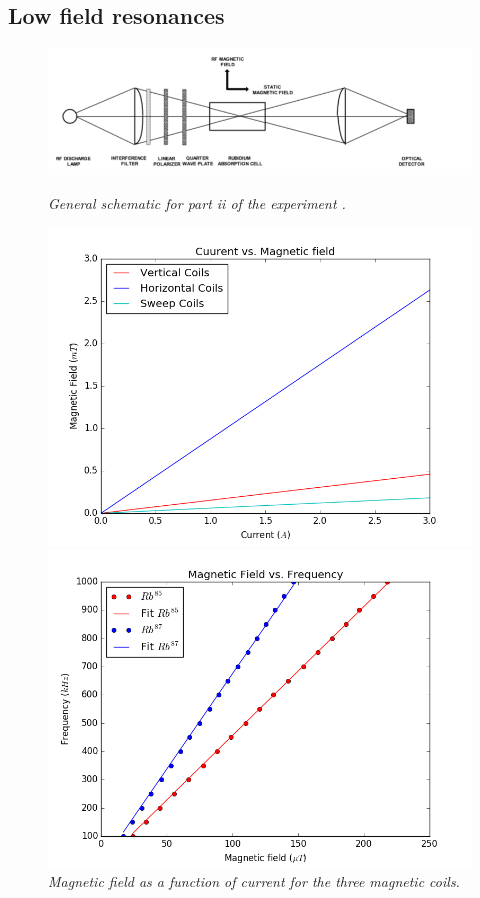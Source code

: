 \documentclass[twocolumn]{article}
\begin{document}
\subsection{Low field resonances}
\begin{figure}
\center
\begin{minipage}[t]{\textwidth}
\includegraphics[width=\linewidth]{pictures/ii-schem.png}
\caption{\textit{General schematic for part ii of the experiment \cite{ref:3}.}}
\label{fig:19}
\end{minipage}
\begin{minipage}[t]{0.45\textwidth}
\includegraphics[width=\linewidth]{pictures/current-field.png}
\caption{\textit{Magnetic field as a function of current for the three magnetic 
coils.}}
\label{fig:20}
\end{minipage}
\hfill
\begin{minipage}[t]{0.45\textwidth}
\includegraphics[width=\linewidth]{pictures/field-frequency.png}

\end{minipage}
\end{figure}
\end{document}
